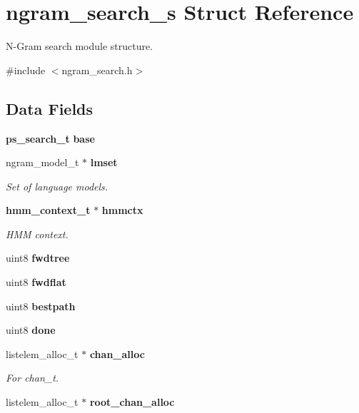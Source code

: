 \section{ngram\-\_\-search\-\_\-s Struct Reference}
\label{structngram__search__s}


N-\/\-Gram search module structure.  




{\ttfamily \#include $<$ngram\-\_\-search.\-h$>$}

\subsection*{Data Fields}
\begin{DoxyCompactItemize}
\item 
{\bf ps\-\_\-search\-\_\-t} {\bfseries base}\label{structngram__search__s_a572ad45de5b0f364096f0a8544fe5bf7}

\item 
ngram\-\_\-model\-\_\-t $\ast$ {\bf lmset}
\begin{DoxyCompactList}\small\item\em Set of language models. \end{DoxyCompactList}\item 
{\bf hmm\-\_\-context\-\_\-t} $\ast$ {\bf hmmctx}
\begin{DoxyCompactList}\small\item\em H\-M\-M context. \end{DoxyCompactList}\item 
uint8 {\bfseries fwdtree}\label{structngram__search__s_aca37c8278a0dacb881cc6a2b0953c076}

\item 
uint8 {\bfseries fwdflat}\label{structngram__search__s_a88358958f4f983c96034cbbd4bc8f5cd}

\item 
uint8 {\bfseries bestpath}\label{structngram__search__s_a0d1daeb151911b2243a1a91566be9063}

\item 
uint8 {\bfseries done}\label{structngram__search__s_a3c51a66cf26de3aa050b3615d14ff060}

\item 
listelem\-\_\-alloc\-\_\-t $\ast$ {\bf chan\-\_\-alloc}\label{structngram__search__s_abe9fe60f6e48b9a6e3d41856bb1dc109}

\begin{DoxyCompactList}\small\item\em For chan\-\_\-t. \end{DoxyCompactList}\item 
listelem\-\_\-alloc\-\_\-t $\ast$ {\bf root\-\_\-chan\-\_\-alloc}\label{structngram__search__s_a576470858bfa44c671f0e677902ab424}


\end{DoxyCompactItemize}
